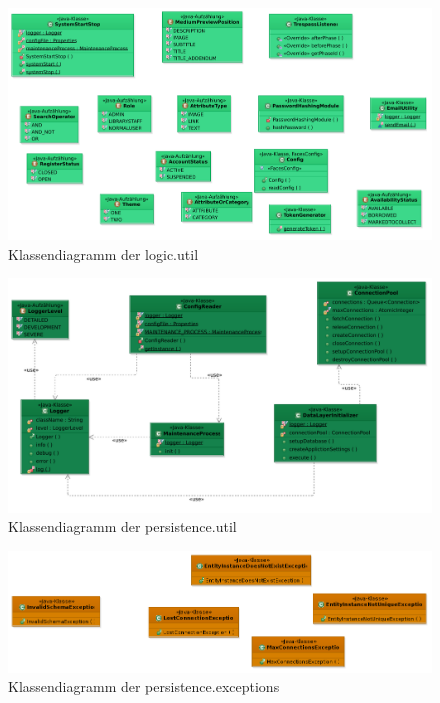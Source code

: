 \documentclass{article}
\begin{document}
\begin{figure}[H]
\hypertarget{PhaseListener}{}
\hypertarget{Hash}{}
		\centering
		\includegraphics[width = 52em]{KlassendiagrammUtilObere}
		\caption{Klassendiagramm der logic.util}
	\end{figure}


\begin{figure}[H]
		\centering
		\includegraphics[width = 52em]{KlassendiagrammUtilunten}
		\caption{Klassendiagramm der persistence.util}
	\end{figure}


\begin{figure}[H]
		\centering
		\includegraphics[width = 52em]{Klassendiagramm-ExceptionUnten}
		\caption{Klassendiagramm der persistence.exceptions}
\end{figure}
\restoregeometry
\newpage
\end{document}

